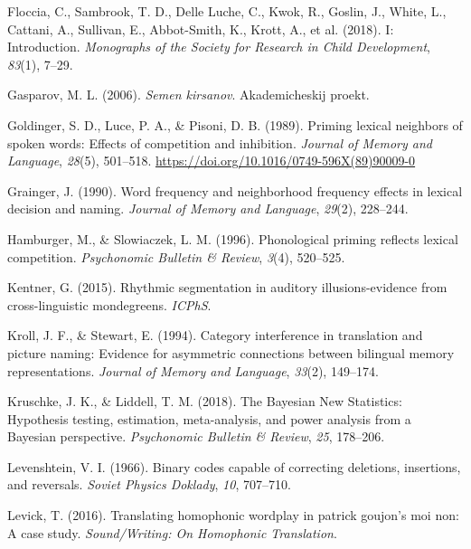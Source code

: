 \documentclass[
]{article}
\newlength{\cslhangindent}
\newenvironment{CSLReferences}[2] %
 {\begin{list}{}{%
  \setlength{\itemindent}{0pt}
  \setlength{\leftmargin}{0pt}
  \setlength{\parsep}{0pt}
  \ifodd #1
   \setlength{\leftmargin}{\cslhangindent}
   \setlength{\itemindent}{-1\cslhangindent}
  \fi
  \setlength{\itemsep}{#2\baselineskip}}}
 {\end{list}}
\begin{document}
\begin{CSLReferences}{1}{0}
Floccia, C., Sambrook, T. D., Delle Luche, C., Kwok, R., Goslin, J.,
White, L., Cattani, A., Sullivan, E., Abbot-Smith, K., Krott, A., et al.
(2018). I: {Introduction}. \emph{Monographs of the Society for Research
in Child Development}, \emph{83}(1), 7--29.

Gasparov, M. L. (2006). \emph{Semen kirsanov}. Akademicheskij proekt.

Goldinger, S. D., Luce, P. A., \& Pisoni, D. B. (1989). Priming lexical
neighbors of spoken words: {Effects} of competition and inhibition.
\emph{Journal of Memory and Language}, \emph{28}(5), 501--518.
\url{https://doi.org/10.1016/0749-596X(89)90009-0}

Grainger, J. (1990). Word frequency and neighborhood frequency effects
in lexical decision and naming. \emph{Journal of Memory and Language},
\emph{29}(2), 228--244.

Hamburger, M., \& Slowiaczek, L. M. (1996). Phonological priming
reflects lexical competition. \emph{Psychonomic Bulletin \& Review},
\emph{3}(4), 520--525.

Kentner, G. (2015). Rhythmic segmentation in auditory illusions-evidence
from cross-linguistic mondegreens. \emph{ICPhS}.

Kroll, J. F., \& Stewart, E. (1994). Category interference in
translation and picture naming: {Evidence} for asymmetric connections
between bilingual memory representations. \emph{Journal of Memory and
Language}, \emph{33}(2), 149--174.

Kruschke, J. K., \& Liddell, T. M. (2018). The {Bayesian New
Statistics}: {Hypothesis} testing, estimation, meta-analysis, and power
analysis from a {Bayesian} perspective. \emph{Psychonomic Bulletin \&
Review}, \emph{25}, 178--206.

Levenshtein, V. I. (1966). Binary codes capable of correcting deletions,
insertions, and reversals. \emph{Soviet Physics Doklady}, \emph{10},
707--710.

Levick, T. (2016). Translating homophonic wordplay in patrick goujon's
moi non: A case study. \emph{Sound/Writing: On Homophonic Translation}.


\end{CSLReferences}
\end{document}
